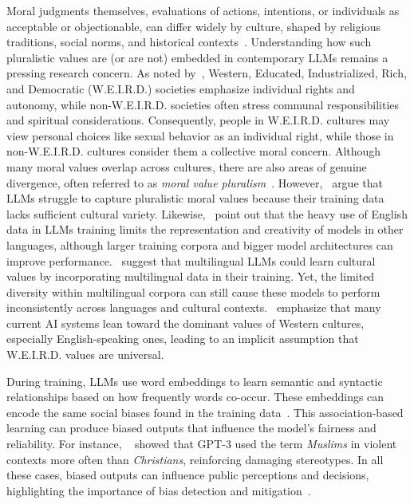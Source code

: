 \documentclass[11pt]{article}
\begin{document}
Moral judgments themselves, evaluations of actions, intentions, or individuals as acceptable or objectionable, can differ widely by culture, shaped by religious traditions, social norms, and historical contexts~\citep{Haidt2001, Shweder1997}. Understanding how such pluralistic values are (or are not) embedded in contemporary LLMs remains a pressing research concern.  As noted by~\citet{Graham2016}, Western, Educated, Industrialized, Rich, and Democratic (W.E.I.R.D.) societies emphasize individual rights and autonomy, while non-W.E.I.R.D. societies often stress communal responsibilities and spiritual considerations. Consequently, people in W.E.I.R.D. cultures may view personal choices like sexual behavior as an individual right, while those in non-W.E.I.R.D. cultures consider them a collective moral concern. Although many moral values overlap across cultures, there are also areas of genuine divergence, often referred to as \emph{moral value pluralism}~\citep{Johnson2022, Benkler2023}. However,~\citet{Kharchenko2024} argue that LLMs struggle to capture pluralistic moral values because their training data lacks sufficient cultural variety. Likewise,~\citet{Du2024} point out that the heavy use of English data in LLMs training limits the representation and creativity of models in other languages, although larger training corpora and bigger model architectures can improve performance.~\citet{arora2023probing} suggest that multilingual LLMs could learn cultural values by incorporating multilingual data in their training. Yet, the limited diversity within multilingual corpora can still cause these models to perform inconsistently across languages and cultural contexts.~\citet{Benkler2023} emphasize that many current AI systems lean toward the dominant values of Western cultures, especially English-speaking ones, leading to an implicit assumption that W.E.I.R.D. values are universal.

During training, LLMs use word embeddings to learn semantic and syntactic relationships based on how frequently words co-occur. These embeddings can encode the same social biases found in the training data~\citep{nemani2024gender, mohammadi2025explainability}. This association-based learning can produce biased outputs that influence the model’s fairness and reliability. For instance, ~\citet{Johnson2022} showed that GPT-3 used the term \emph{Muslims} in violent contexts more often than \emph{Christians}, reinforcing damaging stereotypes. In all these cases, biased outputs can influence public perceptions and decisions, highlighting the importance of bias detection and mitigation~\citep{Noble2018, Zou2018}.
%
\end{document}
